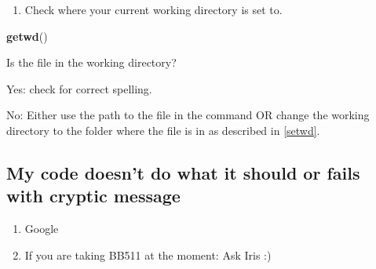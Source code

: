 \documentclass[
]{book}
\newenvironment{Shaded}{\begin{snugshade}}{\end{snugshade}}
\newcommand{\FunctionTok}[1]{\textcolor[rgb]{0.13,0.29,0.53}{\textbf{#1}}}
\newcommand{\NormalTok}[1]{#1}
\providecommand{\tightlist}{%
  \setlength{\itemsep}{0pt}\setlength{\parskip}{0pt}}
\begin{document}
\begin{enumerate}
\def\labelenumi{\arabic{enumi}.}
\tightlist
\item
  Check where your current working directory is set to.
\end{enumerate}

\begin{Shaded}
\begin{Highlighting}[]
\FunctionTok{getwd}\NormalTok{()}
\end{Highlighting}
\end{Shaded}

Is the file in the working directory?

Yes: check for correct spelling.

No: Either use the path to the file in the command OR change the working directory to the folder where the file is in as described in \ref{setwd}.

\subsection{My code doesn't do what it should or fails with cryptic message}\label{my-code-doesnt-do-what-it-should-or-fails-with-cryptic-message}

\begin{enumerate}
\def\labelenumi{\arabic{enumi}.}
\tightlist
\item
  Google
\item
  If you are taking BB511 at the moment: Ask Iris :)
\end{enumerate}

  
\end{document}
